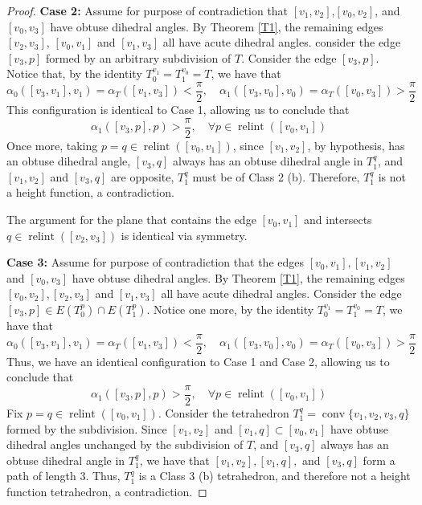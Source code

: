 \documentclass{mainresearch}
\begin{document}
\begin{proof}
	\noindent\textbf{Case 2:} Assume for purpose of contradiction that $[v_1,v_2]$,$[v_0,v_2]$, and $[v_0,v_3]$ have obtuse dihedral angles. By Theorem \ref{T1}, the remaining edges $[v_2,v_3]$, $[v_0,v_1]$ and $[v_1,v_3]$ all have acute dihedral angles. consider the edge $[v_3,p]$ formed by an arbitrary subdivision of $T$. Consider the edge $[v_3,p]$. Notice that, by the identity $T_0^{v_1}=T_1^{v_0} = T$, we have that 
	\begin{equation*}
		\alpha_0([v_3,v_1],v_1) = \alpha_T([v_1,v_3]) < \frac{\pi}{2}, \quad \alpha_1([v_3,v_0],v_0) = \alpha_T([v_0,v_3]) > \frac{\pi}{2}
	\end{equation*}
	This configuration is identical to Case 1, allowing us to conclude that
	\begin{equation*}
		\alpha_1([v_3,p],p) > \frac{\pi}{2},\quad \forall p \in \operatorname{relint}([v_0,v_1])
	\end{equation*}
	Once more, taking $p=q \in \operatorname{relint}([v_0,v_1])$, since $[v_1,v_2]$, by hypothesis, has an obtuse dihedral angle, $[v_3,q]$ always has an obtuse dihedral angle in $T_1^q$, and $[v_1,v_2]$ and $[v_3,q]$ are opposite, $T_1^q$ must be of Class 2 (b). Therefore, $T_1^q$ is not a height function, a contradiction.
	
	\begin{remark}
		The argument for the plane that contains the edge $[v_0,v_1]$ and intersects $q\in \operatorname{relint}([v_2,v_3])$ is identical via symmetry.
	\end{remark}
	
	\bigskip
	
	\noindent\textbf{Case 3:} Assume for purpose of contradiction that the edges $[v_0,v_1],[v_1,v_2]$ and $[v_0,v_3]$ have obtuse dihedral angles. By Theorem \ref{T1}, the remaining edges $[v_0,v_2],[v_2,v_3]$ and $[v_1,v_3]$ all have acute dihedral angles. Consider the edge $[v_3,p] \in E(T_0^p) \cap E(T_1^p)$. Notice one more, by the identity $T_0^{v_1} = T_1^{v_0} = T$, we have that
	\begin{equation*}
		\alpha_0([v_3,v_1],v_1) = \alpha_T([v_1,v_3]) < \frac{\pi}{2}, \quad \alpha_1([v_3,v_0],v_0) = \alpha_T([v_0,v_3]) > \frac{\pi}{2}
	\end{equation*}
	Thus, we have an identical configuration to Case 1 and Case 2, allowing us to conclude that
	\begin{equation*}
		\alpha_1([v_3,p],p) > \frac{\pi}{2},\quad \forall p \in \operatorname{relint}([v_0,v_1])
	\end{equation*}
	Fix $p=q \in \operatorname{relint}([v_0,v_1])$. Consider the tetrahedron $T_1^q = \operatorname{conv}\{v_1,v_2,v_3,q\}$ formed by the subdivision. Since $[v_1,v_2]$ and $[v_1,q] \subset[v_0,v_1]$ have obtuse dihedral angles unchanged by the subdivision of $T$, and $[v_3,q]$ always has an obtuse dihedral angle in $T_1^q$, we have that $[v_1,v_2],[v_1,q],$ and $[v_3,q]$ form a path of length 3. Thus, $T_1^q$ is a Class 3 (b) tetrahedron, and therefore not a height function tetrahedron, a contradiction.
	
\end{proof}
\end{document}
